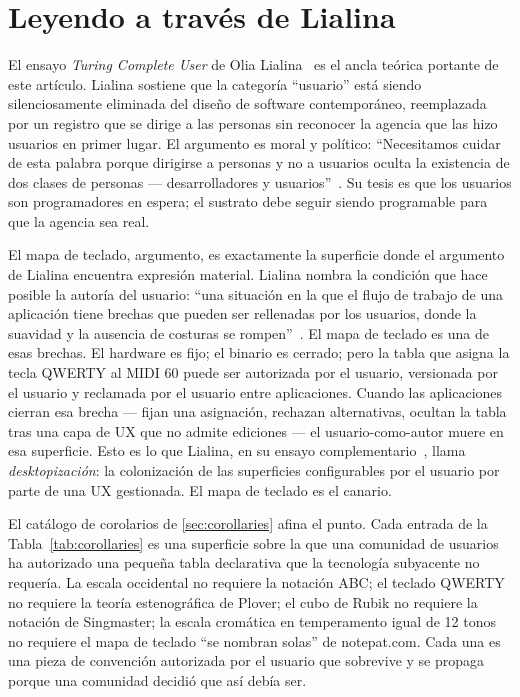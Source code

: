 \documentclass[10pt,letterpaper,twocolumn]{article}
\DeclareRobustCommand{\key}[1]{\tikz[baseline=(k.base)]{%
 \node[fill=keystroke, rounded corners=1.3pt, inner xsep=2.4pt,
    inner ysep=1.9pt, anchor=base, yshift=-1.2pt] at (0,0)
  {\footnotesize\ttfamily\bfseries\vphantom{A}\phantom{#1}};
 \node[draw=keystroke, line width=0.4pt, fill=keyfill,
    rounded corners=1.3pt, inner xsep=2.4pt, inner ysep=1.9pt,
    anchor=base] (k) at (0,0)
  {\footnotesize\ttfamily\bfseries\vphantom{A}#1};}}
\begin{document}
\section{Leyendo a través de Lialina}
\label{sec:lialina}

El ensayo \emph{Turing Complete User} de Olia Lialina~\citep{lialina2012turing,lialina2021turingbook} es el ancla teórica portante de este artículo. Lialina sostiene que la categoría ``usuario'' está siendo silenciosamente eliminada del diseño de software contemporáneo, reemplazada por un registro que se dirige a las personas sin reconocer la agencia que las hizo usuarios en primer lugar. El argumento es moral y político: ``Necesitamos cuidar de esta palabra porque dirigirse a personas y no a usuarios oculta la existencia de dos clases de personas --- desarrolladores y usuarios''~\citep{lialina2012turing}. Su tesis es que los usuarios son programadores en espera; el sustrato debe seguir siendo programable para que la agencia sea real.

El mapa de teclado, argumento, es exactamente la superficie donde el argumento de Lialina encuentra expresión material. Lialina nombra la condición que hace posible la autoría del usuario: ``una situación en la que el flujo de trabajo de una aplicación tiene brechas que pueden ser rellenadas por los usuarios, donde la suavidad y la ausencia de costuras se rompen''~\citep{lialina2012turing}. El mapa de teclado es una de esas brechas. El hardware es fijo; el binario es cerrado; pero la tabla que asigna la tecla QWERTY \key{A} al MIDI 60 puede ser autorizada por el usuario, versionada por el usuario y reclamada por el usuario entre aplicaciones. Cuando las aplicaciones cierran esa brecha --- fijan una asignación, rechazan alternativas, ocultan la tabla tras una capa de UX que no admite ediciones --- el usuario-como-autor muere en esa superficie. Esto es lo que Lialina, en su ensayo complementario~\citep{lialina2018rich}, llama \emph{desktopización}: la colonización de las superficies configurables por el usuario por parte de una UX gestionada. El mapa de teclado es el canario.

El catálogo de corolarios de \textsection\ref{sec:corollaries} afina el punto. Cada entrada de la Tabla~\ref{tab:corollaries} es una superficie sobre la que una comunidad de usuarios ha autorizado una pequeña tabla declarativa que la tecnología subyacente no requería. La escala occidental no requiere la notación ABC; el teclado QWERTY no requiere la teoría estenográfica de Plover; el cubo de Rubik no requiere la notación de Singmaster; la escala cromática en temperamento igual de 12 tonos no requiere el mapa de teclado ``se nombran solas'' de notepat.com. Cada una es una pieza de convención autorizada por el usuario que sobrevive y se propaga porque una comunidad decidió que así debía ser.
\end{document}
